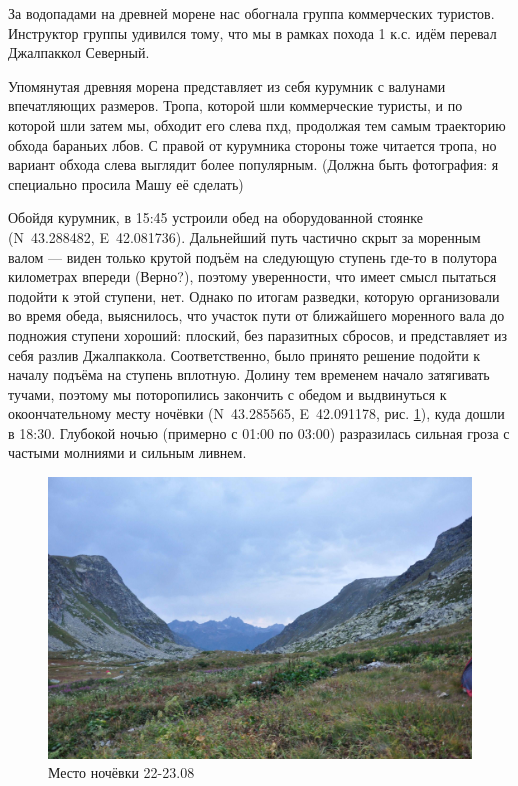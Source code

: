 За водопадами на древней морене нас обогнала группа коммерческих туристов. Инструктор группы удивился тому, что мы в рамках похода 1 к.с. идём перевал Джалпаккол Северный. 

Упомянутая древняя морена представляет из себя курумник с валунами впечатляющих размеров. Тропа, которой шли коммерческие туристы, и по которой шли затем мы, обходит его слева пхд, продолжая тем самым траекторию обхода бараньих лбов. С правой от курумника стороны тоже читается тропа, но вариант обхода слева выглядит более популярным. \alert{(Должна быть фотография: я специально просила Машу её сделать)}

Обойдя курумник, в 15:45 устроили обед на оборудованной стоянке (N~43.288482\degree, E~42.081736\degree). Дальнейший путь частично скрыт за моренным валом --- виден только крутой подъём на следующую ступень где-то в полутора километрах впереди \alert{(Верно?)}, поэтому уверенности, что имеет смысл пытаться подойти к этой ступени, нет. Однако по итогам разведки, которую организовали во время обеда, выяснилось, что участок пути от ближайшего моренного вала до подножия ступени хороший: плоский, без паразитных сбросов, и представляет из себя разлив Джалпаккола. Соответственно, было принято решение подойти к началу подъёма на ступень вплотную. Долину тем временем начало затягивать тучами, поэтому мы поторопились закончить с обедом и выдвинуться к окоончательному месту ночёвки (N~43.285565\degree, E~42.091178\degree, рис. \ref{fig:DSC_0018}), куда дошли в 18:30. Глубокой ночью (примерно с 01:00 по 03:00) разразилась сильная гроза с частыми молниями и сильным ливнем.

\begin{figure}[h!]
	\centering
	\includegraphics[width=0.7\linewidth]{../pics/DSC_0018}
	\caption{Место ночёвки 22-23.08}
	\label{fig:DSC_0018}
\end{figure}

\clearpage